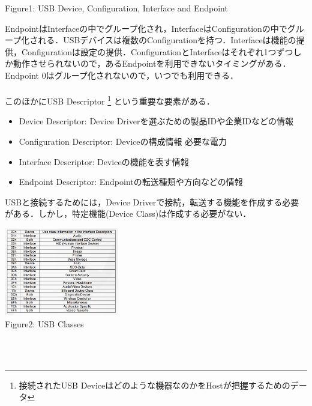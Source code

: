 \documentclass[10pt]{jreport}
\begin{document}
\begin{description}
\begin{center}
        Figure1: USB Device, Configuration, Interface and Endpoint
      \end{center}
      EndpointはInterfaceの中でグループ化され，InterfaceはConfigurationの中でグループ化される．USBデバイスは複数のConfigurationを持つ．Interfaceは機能の提供，Configurationは設定の提供．ConfigurationとInterfaceはそれぞれ1つずつしか動作させられないので，あるEndpointを利用できないタイミングがある．Endpoint 0はグループ化されないので，いつでも利用できる．\\\\
      このほかにUSB Descriptor
      \footnote[2]{接続されたUSB Deviceはどのような機器なのかをHostが把握するためのデータ}
      という重要な要素がある．
      \begin{itemize}
        \item Device Descriptor: Device Driverを選ぶための製品IDや企業IDなどの情報
        \item Configuration Descriptor: Deviceの構成情報 必要な電力
        \item Interface Descriptor: Deviceの機能を表す情報
        \item Endpoint Descriptor: Endpointの転送種類や方向などの情報
      \end{itemize}
      USBと接続するためには，Device Driverで接続，転送する機能を作成する必要がある．しかし，特定機能(Device Class)は作成する必要がない．
      \begin{center}
        \includegraphics[width=5cm]{img/USB-2.png} \\
        Figure2: USB Classes
        \end{center}\\\\


\end{description}
\end{document}
